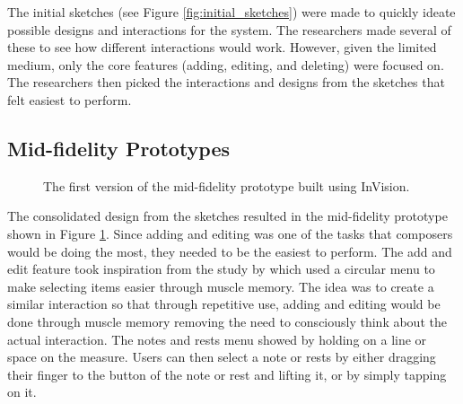 			The initial sketches (see Figure \ref{fig:initial_sketches}) were made to quickly ideate possible designs and interactions for the system. The researchers made several of these to see how different interactions would work. However, given the limited medium, only the core features (adding, editing, and deleting) were focused on. The researchers then picked the interactions and designs from the sketches that felt easiest to perform.

		\subsection{Mid-fidelity Prototypes}
		\label{sec:mid-fidelity-prototypes}

			\begin{figure}[H]
				\centering
			    \caption{The first version of the mid-fidelity prototype built using InVision.}
			    \label{fig:invision_v1}
			\end{figure} 

			The consolidated design from the sketches resulted in the mid-fidelity prototype shown in Figure \ref{fig:invision_v1}. Since adding and editing was one of the tasks that composers would be doing the most, they needed to be the easiest to perform. The add and edit feature took inspiration from the study by \citet{zhao2007earpod} which used a circular menu to make selecting items easier through muscle memory. The idea was to create a similar interaction so that through repetitive use, adding and editing would be done through muscle memory removing the need to consciously think about the actual interaction. The notes and rests menu showed by holding on a line or space on the measure. Users can then select a note or rests by either dragging their finger to the button of the note or rest and lifting it, or by simply tapping on it. 

